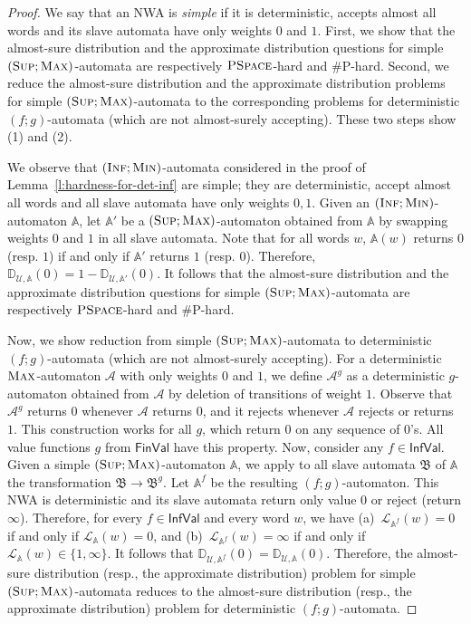 \documentclass{lmcs}
\newcommand{\nestedA}{\mathbb{A}}
\newcommand{\slaveA}{{\mathfrak{B}}}
\newcommand{\valueL}[1]{\mathcal{L}_{{#1}}}
\newcommand{\PSPACE}{\textsc{PSpace}{}}
\newcommand{\fmax}{\textsc{Max}}
\newcommand{\fmin}{\textsc{Min}}
\newcommand{\fsup}{\textsc{Sup}}
\newcommand{\finf}{\textsc{Inf}}
\newcommand{\aut}{\mathcal{A}}
\newcommand{\FinVal}{\mathsf{FinVal}}
\newcommand{\InfVal}{\mathsf{InfVal}}
\newcommand{\distrib}{\mathbb{D}}
\newcommand{\calU}{\mathcal{U}}
\begin{document}
\begin{proof}
We say that an NWA is \emph{simple} if it is deterministic, accepts almost all words and its slave automata have only weights $0$ and $1$.
First, we show that the almost-sure distribution and the approximate distribution questions for simple $(\fsup;\fmax)$-automata are respectively $\PSPACE$-hard and
\#P-hard. Second, we reduce the almost-sure distribution and the approximate distribution problems for simple $(\fsup;\fmax)$-automata to
the corresponding problems for deterministic $(f;g)$-automata (which are not
almost-surely accepting). These two steps show (1) and (2).

We observe that $(\finf;\fmin)$-automata considered
in the proof of Lemma~\ref{l:hardness-for-det-inf} are simple; they are deterministic, accept almost all words and all slave automata have only weights $0,1$.
Given an $(\finf;\fmin)$-automaton $\nestedA$, let $\nestedA'$ be a $(\fsup;\fmax)$-automaton
obtained from $\nestedA$ by swapping weights $0$ and $1$ in all slave automata. Note that
for all words $w$, $\nestedA(w)$ returns $0$ (resp. $1$)  if and only if $\nestedA'$ returns $1$ (resp. $0$).
Therefore, $\distrib_{\calU,\nestedA}(0) = 1 - \distrib_{\calU,\nestedA'}(0)$.
It follows that the almost-sure distribution and the approximate distribution questions for simple
$(\fsup;\fmax)$-automata are respectively  $\PSPACE$-hard and \#P-hard.


Now, we show reduction from simple $(\fsup;\fmax)$-automata  to deterministic $(f;g)$-automata (which are not almost-surely accepting).
For a deterministic $\fmax$-automaton $\aut$ with only weights $0$ and $1$, we define $\aut^g$ as
a deterministic $g$-automaton obtained from $\aut$ by deletion of transitions of weight $1$.
Observe that $\aut^g$ returns $0$ whenever $\aut$ returns $0$, and it rejects whenever $\aut$ rejects or returns $1$.
This construction works for all $g$, which return $0$ on any sequence of $0$'s.
All value functions $g$ from $\FinVal$ have this property.
Now, consider any $f \in \InfVal$.
Given a simple $(\fsup;\fmax)$-automaton $\nestedA$,
 we apply to all slave automata $\slaveA$ of $\nestedA$ the transformation $\slaveA \to \slaveA^g$.
Let $\nestedA^f$ be the resulting $(f;g)$-automaton.
This NWA is deterministic and its slave automata return only value $0$ or reject (return $\infty$).
Therefore, for every $f \in \InfVal$ and every word $w$, we have
(a)~$\valueL{\nestedA^f}(w) = 0$ if and only if $\valueL{\nestedA}(w) = 0$, and
(b)~$\valueL{\nestedA^f}(w) = \infty$ if and only if $\valueL{\nestedA}(w) \in \{1,\infty\}$.
It follows that $\distrib_{\calU,\nestedA^f}(0)=\distrib_{\calU,\nestedA}(0)$.
Therefore, the almost-sure distribution (resp., the approximate distribution) problem for simple $(\fsup;\fmax)$-automata
reduces to the almost-sure distribution (resp., the approximate distribution) problem for deterministic $(f;g)$-automata.
\end{proof}
\end{document}

